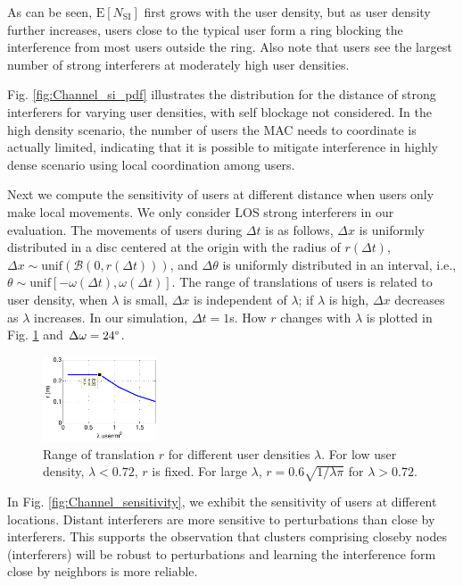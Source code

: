 \documentclass[10pt, conference, letterpaper]{IEEEtran}
\begin{document}
As can be seen, $\mathrm{E}[N_{\mathrm{SI}}]$ first grows with the user density, but as user density further increases, users close to the typical user form a ring blocking the interference from most users outside the ring. 
Also note that users see the largest number of strong interferers at moderately high user densities. 

Fig. \ref{fig:Channel_si_pdf} illustrates the distribution for the distance of strong interferers for varying user densities, with self blockage not considered. 
In the high density scenario, the number of users the MAC needs to coordinate is actually limited, indicating that it is possible to mitigate interference in highly dense scenario using local coordination among users.

Next we compute the sensitivity of users at different distance when users only make local movements. We only consider LOS strong interferers in our evaluation. The movements of users during $\Delta t$ is as follows, $\Delta x$ is uniformly distributed in a disc centered at the origin with the radius of $r(\Delta t)$, $\Delta x \sim \mathrm{unif}(\mathcal{B}(0, r(\Delta t)))$, and $\Delta \theta$ is uniformly distributed in an interval, i.e., $\theta \sim \mathrm{unif}[-\omega(\Delta t), \omega(\Delta t)]$. The range of translations of users is related to user density, when $\lambda$ is small, $\Delta x$ is independent of $\lambda$; if $\lambda$ is high, $\Delta x$ decreases as $\lambda$ increases. In our simulation, $\Delta t = 1$s. How $r$ changes with $\lambda$ is plotted in Fig. \ref{fig:Channel_translation_range} and $\Delta \omega = 24\degree$.

\begin{figure}
	\centering
	\includegraphics[width = 0.3\textwidth]{Channel_translation_range.pdf}
	\caption{Range of translation $r$ for different user densities $\lambda$. For low user density, $\lambda<0.72$, $r$ is fixed. For large $\lambda$, $r = 0.6 \sqrt{1/\lambda\pi}$ for $\lambda >0.72$.}
	\label{fig:Channel_translation_range}
\end{figure}

In Fig. \ref{fig:Channel_sensitivity}, we exhibit the sensitivity of users at different locations. Distant interferers are more sensitive to perturbations than close by interferers. 
This supports the observation that clusters comprising closeby nodes (interferers) will be robust to perturbations and learning the interference form close by neighbors is more reliable. 
\end{document}
